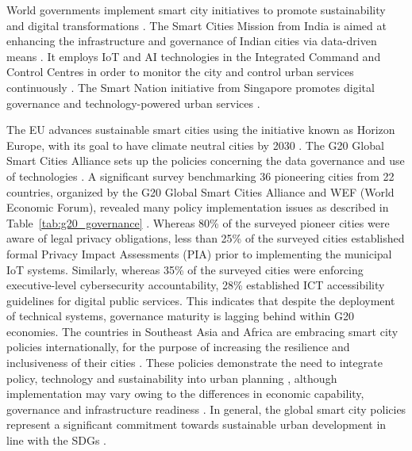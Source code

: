 \documentclass[pdflatex,sn-mathphys-num]{sn-jnl}%
\theoremstyle{thmstyleone}%
\theoremstyle{thmstyletwo}%
\theoremstyle{thmstylethree}%
\begin{document}
World governments implement smart city initiatives to promote sustainability and digital transformations \cite{r1,r120}. The Smart Cities Mission from India is aimed at enhancing the infrastructure and governance of Indian cities via data-driven means \cite{r2,r121}. It employs IoT and AI technologies in the Integrated Command and Control Centres in order to monitor the city and control urban services continuously \cite{r3,r122}. The Smart Nation initiative from Singapore promotes digital governance and technology-powered urban services \cite{r4,r123}.

The EU advances sustainable smart cities using the initiative known as Horizon Europe, with its goal to have climate neutral cities by 2030 \cite{r1,r120}. The G20 Global Smart Cities Alliance sets up the policies concerning the data governance and use of technologies \cite{r94}. A significant survey benchmarking 36 pioneering cities from 22 countries, organized by the G20 Global Smart Cities Alliance and WEF (World Economic Forum), revealed many policy implementation issues as described in Table~\ref{tab:g20_governance} \cite{r129}. Whereas 80\% of the surveyed pioneer cities were aware of legal privacy obligations, less than 25\% of the surveyed cities established formal Privacy Impact Assessments (PIA) prior to implementing the municipal IoT systems. Similarly, whereas 35\% of the surveyed cities were enforcing executive-level cybersecurity accountability, 28\% established ICT accessibility guidelines for digital public services. This indicates that despite the deployment of technical systems, governance maturity is lagging behind within G20 economies. The countries in Southeast Asia and Africa are embracing smart city policies internationally, for the purpose of increasing the resilience and inclusiveness of their cities \cite{r4,r123}. These policies demonstrate the need to integrate policy, technology and sustainability into urban planning \cite{r1,r120,r4,r123}, although implementation may vary owing to the differences in economic capability, governance and infrastructure readiness \cite{r4,r123}. In general, the global smart city policies represent a significant commitment towards sustainable urban development in line with the SDGs \cite{r1,r114,r120}.
\end{document}
